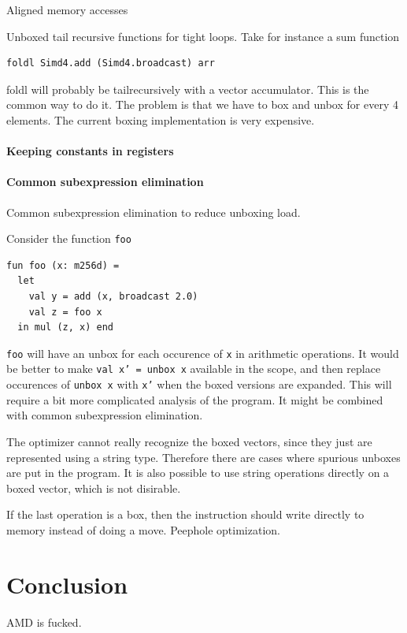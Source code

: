 \documentclass{article}
\begin{document}
Aligned memory accesses

Unboxed tail recursive functions for tight loops. Take for instance a sum function

\begin{lstlisting}
foldl Simd4.add (Simd4.broadcast) arr
\end{lstlisting}

foldl will probably be tailrecursively with a vector accumulator. This is the common way to do it. The problem is that we have to box and unbox for every 4 elements. The current boxing implementation is very expensive.

\paragraph{Keeping constants in registers}

\paragraph{Common subexpression elimination}

Common subexpression elimination to reduce unboxing load.

Consider the function \texttt{foo}
\begin{lstlisting}
fun foo (x: m256d) =
  let
    val y = add (x, broadcast 2.0)
    val z = foo x
  in mul (z, x) end
\end{lstlisting}

\texttt{foo} will have an unbox for each occurence of \texttt{x} in arithmetic operations. It would be better to make \texttt{val x' = unbox x} available in the scope, and then replace occurences of \texttt{unbox x} with \texttt{x'} when the boxed versions are expanded. This will require a bit more complicated analysis of the program. It might be combined with common subexpression elimination.

The optimizer cannot really recognize the boxed vectors, since they just are represented using a string type. Therefore there are cases where spurious unboxes are put in the program. It is also possible to use string operations directly on a boxed vector, which is not disirable.

If the last operation is a box, then the instruction should write directly to memory instead of doing a move. Peephole optimization.

\section{Conclusion}

AMD is fucked.




\end{document}
